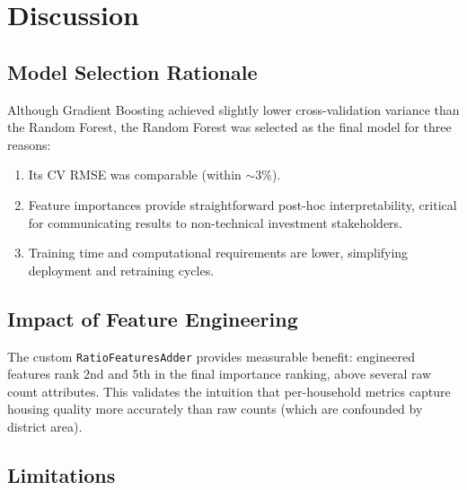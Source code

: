 \documentclass[conference]{IEEEtran}
\begin{document}
\section{Discussion}
\label{sec:discussion}

\subsection{Model Selection Rationale}

Although Gradient Boosting achieved slightly lower cross-validation variance than the Random Forest, the Random Forest was selected as the final model for three reasons:
\begin{enumerate}
    \item Its CV RMSE was comparable (within $\sim$3\%).
    \item Feature importances provide straightforward post-hoc interpretability, critical for communicating results to non-technical investment stakeholders.
    \item Training time and computational requirements are lower, simplifying deployment and retraining cycles.
\end{enumerate}

\subsection{Impact of Feature Engineering}

The custom \texttt{RatioFeaturesAdder} provides measurable benefit: engineered features rank 2nd and 5th in the final importance ranking, above several raw count attributes. This validates the intuition that per-household metrics capture housing quality more accurately than raw counts (which are confounded by district area).

\subsection{Limitations}
\end{document}
